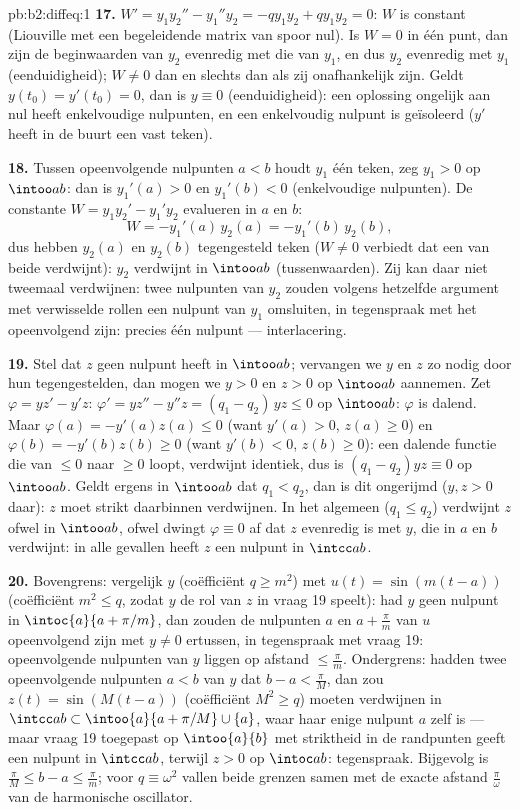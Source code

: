 \begin{solution}{pb:b2:diffeq:1}
\textbf{17.} $W' = y_1y_2'' - y_1''y_2 = -qy_1y_2 + qy_1y_2 = 0$:
$W$ is constant (Liouville met een begeleidende matrix van spoor
nul). Is $W = 0$ in één punt, dan zijn de beginwaarden van $y_2$
evenredig met die van $y_1$, en dus $y_2$ evenredig met $y_1$
(eenduidigheid); $W \neq 0$ dan en slechts dan als zij
onafhankelijk zijn. Geldt $y(t_0) = y'(t_0) = 0$, dan is $y \equiv
0$ (eenduidigheid): een oplossing ongelijk aan nul heeft
enkelvoudige nulpunten, en een enkelvoudig nulpunt is geïsoleerd
($y'$ heeft in de buurt een vast teken).

\textbf{18.} Tussen opeenvolgende nulpunten $a < b$ houdt $y_1$
één teken, zeg $y_1 > 0$ op $\intoo ab$: dan is $y_1'(a) > 0$ en
$y_1'(b) < 0$ (enkelvoudige nulpunten). De constante $W = y_1y_2' -
y_1'y_2$ evalueren in $a$ en $b$:
\[
W = -y_1'(a)\,y_2(a) = -y_1'(b)\,y_2(b) ,
\]
dus hebben $y_2(a)$ en $y_2(b)$ tegengesteld teken ($W \neq 0$
verbiedt dat een van beide verdwijnt): $y_2$ verdwijnt in $\intoo
ab$ (tussenwaarden). Zij kan daar niet tweemaal verdwijnen: twee
nulpunten van $y_2$ zouden volgens hetzelfde argument met
verwisselde rollen een nulpunt van $y_1$ omsluiten, in tegenspraak
met het opeenvolgend zijn: precies één nulpunt --- interlacering.

\textbf{19.} Stel dat $z$ geen nulpunt heeft in $\intoo ab$;
vervangen we $y$ en $z$ zo nodig door hun tegengestelden, dan mogen
we $y > 0$ en $z > 0$ op $\intoo ab$ aannemen. Zet $\varphi = yz' -
y'z$: $\varphi' = yz'' - y''z = (q_1 - q_2)\,yz \leq 0$ op $\intoo
ab$: $\varphi$ is dalend. Maar $\varphi(a) = -y'(a)z(a) \leq 0$
(want $y'(a) > 0$, $z(a) \geq 0$) en $\varphi(b) = -y'(b)z(b) \geq
0$ (want $y'(b) < 0$, $z(b) \geq 0$): een dalende functie die van
$\leq 0$ naar $\geq 0$ loopt, verdwijnt identiek, dus is $(q_1 -
q_2)yz \equiv 0$ op $\intoo ab$. Geldt ergens in $\intoo ab$ dat
$q_1 < q_2$, dan is dit ongerijmd ($y, z > 0$ daar): $z$ moet
strikt daarbinnen verdwijnen. In het algemeen ($q_1 \leq q_2$)
verdwijnt $z$ ofwel in $\intoo ab$, ofwel dwingt $\varphi \equiv 0$
af dat $z$ evenredig is met $y$, die in $a$ en $b$ verdwijnt: in
alle gevallen heeft $z$ een nulpunt in $\intcc ab$.

\textbf{20.} Bovengrens: vergelijk $y$ (coëfficiënt $q \geq m^2$)
met $u(t) = \sin(m(t - a))$ (coëfficiënt $m^2 \leq q$, zodat $y$ de
rol van $z$ in vraag 19 speelt): had $y$ geen nulpunt in
$\intoc{a}{a + \pi/m}$, dan zouden de nulpunten $a$ en $a +
\frac\pi m$ van $u$ opeenvolgend zijn met $y \neq 0$ ertussen, in
tegenspraak met vraag 19: opeenvolgende nulpunten van $y$ liggen op
afstand $\leq \frac\pi m$. Ondergrens: hadden twee opeenvolgende
nulpunten $a < b$ van $y$ dat $b - a < \frac\pi M$, dan zou $z(t) =
\sin(M(t-a))$ (coëfficiënt $M^2 \geq q$) moeten verdwijnen in
$\intcc ab \subset \intoo{a}{a + \pi/M} \cup\{a\}$, waar haar enige
nulpunt $a$ zelf is --- maar vraag 19 toegepast op $\intoo{a}{b}$
met striktheid in de randpunten geeft een nulpunt in $\intcc ab$,
terwijl $z > 0$ op $\intoc ab$: tegenspraak. Bijgevolg is
$\frac\pi M \leq b - a \leq \frac\pi m$; voor $q \equiv \omega^2$
vallen beide grenzen samen met de exacte afstand
$\frac\pi\omega$ van de harmonische oscillator.


\end{solution}
